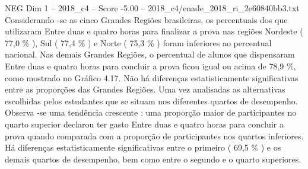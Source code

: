 \begin{textsample}{NEG Dim 1 – 2018\_c4 – Score -5.00 – 2018\_c4/enade\_2018\_ri\_2e60840bb3.txt}
Considerando -se as cinco Grandes Regiões brasileiras, os percentuais dos que utilizaram Entre duas e quatro horas para finalizar a prova nas regiões Nordeste ( 77,0 \% ), Sul ( 77,4 \% ) e Norte ( 75,3 \% ) foram inferiores ao percentual nacional.
Nas demais Grandes Regiões, o percentual de alunos que dispensaram Entre duas e quatro horas para concluir a prova ficou igual ou acima de 78,9 \%, como mostrado no Gráfico 4.17.
Não há diferenças estatisticamente significativas entre as proporções das Grandes Regiões.
Uma vez analisadas as alternativas escolhidas pelos estudantes que se situam nos diferentes quartos de desempenho.
Observa -se uma tendência crescente : uma proporção maior de participantes no quarto superior declarou ter gasto Entre duas e quatro horas para concluir a prova quando comparada com a proporção de participantes nos quartos inferiores.
Há diferenças estatisticamente significativas entre o primeiro ( 69,5 \% ) e os demais quartos de desempenho, bem como entre o segundo e o quarto superiores.

\end{textsample}
